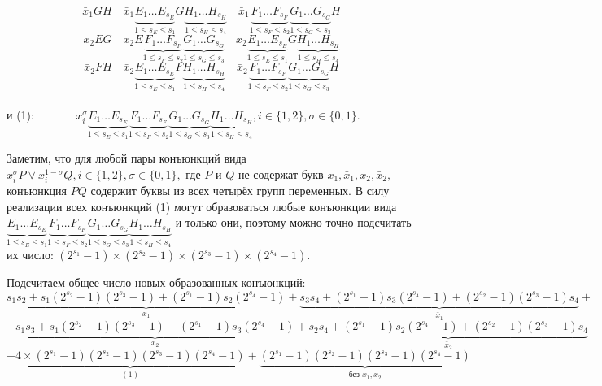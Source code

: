 \documentclass[12pt,a4paper,oneside,fleqn,leqno]{article}
\theoremstyle{definition}
\begin{document}
			$$
				\bar{x}_1GH \quad \bar{x}_1\underbrace{E_1\ldots E_{s_E}}_{1 \leqslant s_E \leqslant s_1}G\underbrace{H_1\ldots H_{s_H}}_{1 \leqslant s_H \leqslant s_4} \quad 
\bar{x}_1\underbrace{F_1\ldots F_{s_F}}_{1 \leqslant s_F \leqslant s_2}\underbrace{G_1\ldots G_{s_G}}_{1 \leqslant s_G \leqslant s_3}H
			$$
			$$
				x_2EG \quad x_2E\underbrace{F_1\ldots F_{s_F}}_{1 \leqslant s_F \leqslant s_2}\underbrace{G_1\ldots G_{s_G}}_{1 \leqslant s_G \leqslant s_3} \quad x_2\underbrace{E_1\ldots E_{s_E}}_{1 \leqslant s_E \leqslant s_1}G\underbrace{H_1\ldots H_{s_H}}_{1 \leqslant s_H \leqslant s_4}
			$$
			$$
				\bar{x}_2FH \quad \bar{x}_2\underbrace{E_1\ldots E_{s_E}}_{1 \leqslant s_E \leqslant s_1}F\underbrace{H_1\ldots H_{s_H}}_{1 \leqslant s_H \leqslant s_4} \quad \bar{x}_2\underbrace{F_1\ldots F_{s_F}}_{1 \leqslant s_F \leqslant s_2}\underbrace{G_1\ldots G_{s_G}}_{1 \leqslant s_G \leqslant s_3}H
			$$\\
			и (1): $\qquad\quad\,\, x_i^{\sigma} \underbrace{E_1\ldots E_{s_E}}_{1\leqslant s_E \leqslant s_1}\underbrace{F_1\ldots F_{s_F}}_{1\leqslant s_F \leqslant s_2}\underbrace{G_1\ldots G_{s_G}}_{1\leqslant s_G \leqslant s_3}\underbrace{H_1\ldots H_{s_H}}_{1\leqslant s_H \leqslant s_4}, i\in\{1,2\},\sigma\in\{0,1\}$.\par
			Заметим, что для любой пары конъюнкций вида $x_i^{\sigma}P \vee x_i^{1 - \sigma}Q, i\in\{1, 2\},\sigma\in\{0,1\},$ где $P$ и $Q$ не содержат букв $x_1, \bar{x}_1, x_2, \bar{x}_2,$ конъюнкция $PQ$ содержит буквы из всех четырёх групп переменных. В силу реализации всех конъюнкций (1) могут образоваться любые конъюнкции вида $\underbrace{E_1\ldots E_{s_E}}_{1\leqslant s_E \leqslant s_1}\underbrace{F_1\ldots F_{s_F}}_{1\leqslant s_F \leqslant s_2}\underbrace{G_1\ldots G_{s_G}}_{1\leqslant s_G \leqslant s_3}\underbrace{H_1\ldots H_{s_H}}_{1\leqslant s_H \leqslant s_4}$ и только они, поэтому можно точно подсчитать их число: $(2^{s_1} - 1) \times (2^{s_2} - 1) \times(2^{s_3} - 1) \times (2^{s_4} - 1).$\par
			Подсчитаем общее число новых образованных конъюнкций:
			$$
				\underbrace{s_1s_2 + s_1(2^{s_2} - 1)(2^{s_3} - 1) + (2^{s_1} - 1)s_2(2^{s_4} - 1)}_{x_1} + \underbrace{s_3s_4 + (2^{s_1} - 1)s_3(2^{s_4} - 1) + (2^{s_2} - 1)(2^{s_3} - 1)s_4}_{\bar{x}_1} +$$
			$$+ \underbrace{s_1s_3 + s_1(2^{s_2} - 1)(2^{s_3} - 1) + (2^{s_1} - 1)s_3(2^{s_4} - 1)}_{x_2} + \underbrace{s_2s_4 + (2^{s_1} - 1)s_2(2^{s_4} - 1) + (2^{s_2} - 1)(2^{s_3} - 1)s_4}_{\bar{x}_2} +$$
			$$+ \underbrace{4\times(2^{s_1} - 1)  (2^{s_2} - 1) (2^{s_3} - 1)  (2^{s_4} - 1)}_{(1)} + \underbrace{(2^{s_1} - 1)  (2^{s_2} - 1) (2^{s_3} - 1)  (2^{s_4} - 1)}_{\text{без } x_1, x_2}$$\par
\end{document}
